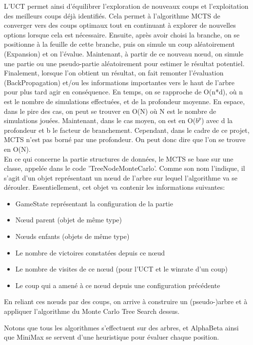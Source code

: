\documentclass{article}
\begin{document}
\begin{itemize}
    L’UCT permet ainsi d’équilibrer l’exploration de nouveaux coups et l’exploitation des meilleurs coups déjà identifiés.
    Cela permet à l’algorithme MCTS de converger vers des coups optimaux tout en continuant à explorer de nouvelles options lorsque cela est nécessaire.
    Ensuite, après avoir choisi la branche, on se positionne à la feuille de cette branche,
    puis on simule un coup aléatoirement (Expansion) et on l'évalue. Maintenant, à partir de ce nouveau nœud, on simule une partie ou une pseudo-partie
    aléatoirement pour estimer le résultat potentiel. Finalement, lorsque l'on obtient un résultat, on fait remonter l'évaluation (BackPropagation)
    et/ou les informations importantes vers le haut de l'arbre pour plus tard agir en conséquence. En temps, on se rapproche de O(n*d), où n est le
    nombre de simulations effectuées, et de la profondeur moyenne. En espace, dans le pire des cas, on peut se trouver en O(N) où N est le nombre
    de simulations jouées. Maintenant, dans le cas moyen, on est en O($b^p$) avec d la profondeur et b le facteur de branchement.
    Cependant, dans le cadre de ce projet, MCTS n'est pas borné par une profondeur. On peut donc dire que l'on se trouve en O(N).\\
    En ce qui concerne la partie structures de données, le MCTS se base sur une classe, appelée dans le code 'TreeNodeMonteCarlo'.
    Comme son nom l'indique, il s'agit d'un objet représentant un nœud de l'arbre sur lequel l'algorithme va se dérouler.
    Essentiellement, cet objet va contenir les informations suivantes:
    \begin{itemize}
        \item GameState représentant la configuration de la partie
        \item Nœud parent (objet de même type)
        \item Nœuds enfants (objets de même type)
        \item Le nombre de victoires constatées depuis ce nœud
        \item Le nombre de visites de ce nœud (pour l'UCT et le winrate d'un coup)
        \item Le coup qui a amené à ce nœud depuis une configuration précédente
    \end{itemize}
    En reliant ces nœuds par des coups, on arrive à construire un (pseudo-)arbre et à appliquer l'algorithme du Monte Carlo Tree Search dessus.
\end{itemize}

\par Notons que tous les algorithmes s'effectuent sur des arbres, et AlphaBeta ainsi que MiniMax se servent d'une heuristique pour évaluer chaque position.
\end{document}
